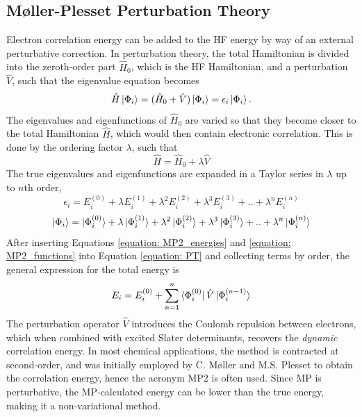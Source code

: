 \subsection{M{\o}ller-Plesset Perturbation Theory}\label{section: MP2}
Electron correlation energy can be added to the \ac{HF} energy by way of an external perturbative correction. In perturbation theory, the total Hamiltonian is divided into the zeroth-order part $\hat{H}_{0}$, which is the \ac{HF} Hamiltonian, and a perturbation $\hat{V}$, such that the eigenvalue equation becomes
\begin{equation}\label{equation: PT}
    \hat{H}\ket{\Phi_{i}}=(\hat{H}_{0}+\hat{V})\ket{\Phi_{i}}=\epsilon_{i}\ket{\Phi_{i}}.
\end{equation}
The eigenvalues and eigenfunctions of $\hat{H}_{0}$ are varied so that they become closer to the total Hamiltonian $\hat{H}$, which would then contain electronic correlation. This is done by the ordering factor $\lambda$, such that
\begin{equation}
    \hat{H}=\hat{H}_{0}+\lambda\hat{V}
\end{equation}
The true eigenvalues and eigenfunctions are expanded in a Taylor series in $\lambda$ up to $n$th order,
\begin{equation}\label{equation: MP2_energies}
    \epsilon_{i}=E_{i}^{(0)}+\lambda{}E_{i}^{(1)}+\lambda^{2}E_{i}^{(2)}+\lambda^{3}E_{i}^{(3)}+..+\lambda^{n}E_{i}^{(n)}
\end{equation}
\begin{equation}\label{equation: MP2_functions}
    \ket{\Phi_{i}}=\ket{\Phi_{i}^{(0)}}+\lambda{}\ket{\Phi_{i}^{(1)}}+\lambda^{2}\ket{\Phi_{i}^{(2)}}+\lambda^{3}\ket{\Phi_{i}^{(3)}}+..+\lambda^{n}\ket{\Phi_{i}^{(n)}}
\end{equation}
After inserting Equations \ref{equation: MP2_energies} and \ref{equation: MP2_functions} into Equation \ref{equation: PT} and collecting terms by order, the general expression for the total energy is
\begin{equation}
E_{i}=E_{i}^{(0)}+\sum_{n=1}^{n}\bra{\Phi_{i}^{(0)}}\hat{V}\ket{\Phi_{i}^{(n-1)}}
\end{equation}
The perturbation operator $\hat{V}$ introduces the Coulomb repulsion between electrons, which when combined with excited Slater determinants, recovers the \textit{dynamic} correlation energy. In most chemical applications, the method is contracted at second-order, and was initially employed by C. M{\o}ller and M.S. Plesset to obtain the correlation energy, hence the acronym \ac{MP2} is often used.\cite{Moller1934} Since MP is perturbative, the MP-calculated energy can be lower than the true energy, making it a non-variational method.
